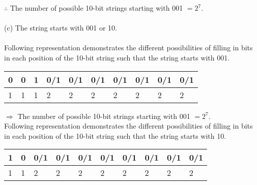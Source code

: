 \documentclass[14pt]{extreport}
\begin{document}
\begin{enumerate}[label=(\alph*)]
$\therefore$ The number of possible 10-bit strings starting with 001 $= 2^{7}.$ \\\\

(c) The string starts with 001 or 10. \\\\
Following representation demonstrates the different possibilities of filling in bits in each position of the 10-bit string such that the string starts with 001.

\begin{table}[ht]
\centering
\begin{tabular}{llllllllll}
\hline
\multicolumn{1}{|l|}{0} & \multicolumn{1}{l|}{0} & \multicolumn{1}{l|}{1} & \multicolumn{1}{l|}{0/1} & \multicolumn{1}{l|}{0/1} & \multicolumn{1}{l|}{0/1} & \multicolumn{1}{l|}{0/1} & \multicolumn{1}{l|}{0/1} & \multicolumn{1}{l|}{0/1} & \multicolumn{1}{l|}{0/1} \\ \hline
1                       & 1                      & 1                      & 2                        & 2                        & 2                        & 2                        & 2                        & 2                        & 2                       
\end{tabular}
\end{table}

$\Rightarrow$ The number of possible 10-bit strings starting with 001 $= 2^{7}.$ \\

Following representation demonstrates the different possibilities of filling in bits in each position of the 10-bit string such that the string starts with 10.

\begin{table}[ht]
\centering
\begin{tabular}{llllllllll}
\hline
\multicolumn{1}{|l|}{1} & \multicolumn{1}{l|}{0} & \multicolumn{1}{l|}{0/1} & \multicolumn{1}{l|}{0/1} & \multicolumn{1}{l|}{0/1} & \multicolumn{1}{l|}{0/1} & \multicolumn{1}{l|}{0/1} & \multicolumn{1}{l|}{0/1} & \multicolumn{1}{l|}{0/1} & \multicolumn{1}{l|}{0/1} \\ \hline
1                       & 1                      & 2                        & 2                        & 2                        & 2                        & 2                        & 2                        & 2                        & 2                       
\end{tabular}
\end{table}


\end{enumerate}
\end{document}
